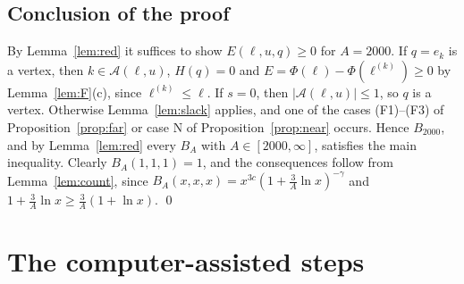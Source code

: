 \documentclass[11pt]{article}
\theoremstyle{definition}
\numberwithin{equation}{section}
\newcommand{\Azero}{2000}
\newcommand{\cA}{\mathcal A}
\begin{document}
\subsection{Conclusion of the proof}
By Lemma~\ref{lem:red} it suffices to show $E(\ell,u,q)\ge0$ for $A=\Azero$. If $q=e_k$ is a vertex, then $k\in\cA(\ell,u)$, $H(q)=0$ and
$E=\Phi(\ell)-\Phi(\ell^{(k)})\ge0$ by Lemma~\ref{lem:F}(c), since $\ell^{(k)}\le\ell$. If $s=0$, then $|\cA(\ell,u)|\le1$, so $q$ is a vertex.
Otherwise Lemma~\ref{lem:slack} applies, and one of the cases (F1)--(F3) of Proposition~\ref{prop:far} or case N of
Proposition~\ref{prop:near} occurs. Hence $B_{\Azero}$, and by Lemma~\ref{lem:red} every $B_A$ with $A\in[\Azero,\infty]$, satisfies the main
inequality. Clearly $B_A(1,1,1)=1$, and the consequences follow from Lemma~\ref{lem:count}, since
$B_A(x,x,x)=x^{3c}(1+\frac3A\ln x)^{-\gamma}$ and $1+\frac3A\ln x\ge\frac3A(1+\ln x)$. \qed

\section{The computer-assisted steps}\label{app:cap}
\end{document}
